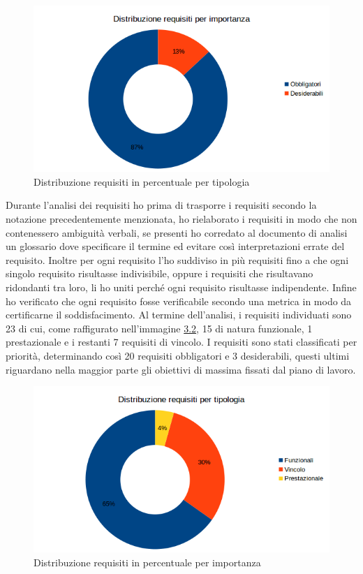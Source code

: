 \begin{figure}[h]
\centering
\includegraphics[scale=0.72]{immagini/distribuzionereqi}
\caption{Distribuzione requisiti in percentuale per tipologia}
\label{fig:distr-req-tip}
\end{figure}
Durante l'analisi dei requisiti ho prima di trasporre i requisiti secondo la notazione precedentemente menzionata, ho rielaborato i requisiti in modo che non contenessero ambiguità verbali, se presenti ho corredato al documento di analisi un glossario dove specificare il termine ed evitare così interpretazioni errate del requisito. Inoltre per ogni requisito l'ho suddiviso in più requisiti fino a che ogni singolo requisito risultasse indivisibile, oppure i requisiti che risultavano ridondanti tra loro, li ho uniti perché ogni requisito risultasse indipendente. Infine ho verificato che ogni requisito fosse verificabile secondo una metrica in modo da certificarne il soddisfacimento. Al termine dell'analisi, i requisiti individuati sono 23 di cui, come raffigurato nell'immagine \href{fig:distr-req-tip}{3.2}, 15 di natura funzionale, 1 prestazionale e i restanti 7 requisiti di vincolo. I requisiti sono stati classificati per priorità, determinando così 20 requisiti obbligatori e 3 desiderabili, questi ultimi riguardano nella maggior parte gli obiettivi di massima fissati dal piano di lavoro. %
\begin{figure}[h]
\centering
\includegraphics[scale=0.72]{immagini/distribuzionereqt}
\caption{Distribuzione requisiti in percentuale per importanza}
\label{fig:distr-req-imp}
\end{figure}

